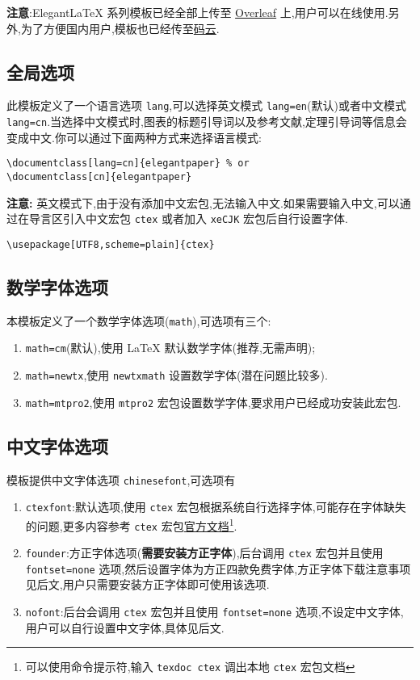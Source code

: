 \documentclass[lang=cn,a4paper]{elegantpaper}
\begin{document}
\textbf{注意}:Elegant\LaTeX{} 系列模板已经全部上传至 \href{https://www.overleaf.com/latex/templates/elegantpaper-template/yzghrqjhmmmr}{Overleaf} 上,用户可以在线使用.另外,为了方便国内用户,模板也已经传至\href{https://gitee.com/ElegantLaTeX/ElegantPaper}{码云}.


\subsection{全局选项}
此模板定义了一个语言选项 \lstinline{lang},可以选择英文模式 \lstinline{lang=en}(默认)或者中文模式 \lstinline{lang=cn}.当选择中文模式时,图表的标题引导词以及参考文献,定理引导词等信息会变成中文.你可以通过下面两种方式来选择语言模式:
\begin{lstlisting}
\documentclass[lang=cn]{elegantpaper} % or
\documentclass[cn]{elegantpaper} 
\end{lstlisting}

\textbf{注意:} 英文模式下,由于没有添加中文宏包,无法输入中文.如果需要输入中文,可以通过在导言区引入中文宏包 \lstinline{ctex} 或者加入 \lstinline{xeCJK} 宏包后自行设置字体. 
\begin{lstlisting}
\usepackage[UTF8,scheme=plain]{ctex}
\end{lstlisting}

\subsection{数学字体选项}

本模板定义了一个数学字体选项(\lstinline{math}),可选项有三个:
\begin{enumerate}
  \item \lstinline{math=cm}(默认),使用 \LaTeX{} 默认数学字体(推荐,无需声明);
  \item \lstinline{math=newtx},使用 \lstinline{newtxmath} 设置数学字体(潜在问题比较多).
  \item \lstinline{math=mtpro2},使用 \lstinline{mtpro2} 宏包设置数学字体,要求用户已经成功安装此宏包.
\end{enumerate}

\subsection{中文字体选项}

模板提供中文字体选项 \lstinline{chinesefont},可选项有
\begin{enumerate}
  \item \lstinline{ctexfont}:默认选项,使用 \lstinline{ctex} 宏包根据系统自行选择字体,可能存在字体缺失的问题,更多内容参考 \lstinline{ctex} 宏包\href{https://ctan.org/pkg/ctex}{官方文档}\footnote{可以使用命令提示符,输入 \lstinline{texdoc ctex} 调出本地 \lstinline{ctex} 宏包文档}.
  \item \lstinline{founder}:方正字体选项(\textbf{需要安装方正字体}),后台调用 \lstinline{ctex} 宏包并且使用 \lstinline{fontset=none} 选项,然后设置字体为方正四款免费字体,方正字体下载注意事项见后文,用户只需要安装方正字体即可使用该选项.
  \item \lstinline{nofont}:后台会调用 \lstinline{ctex} 宏包并且使用 \lstinline{fontset=none} 选项,不设定中文字体,用户可以自行设置中文字体,具体见后文.
\end{enumerate}
\end{document}
